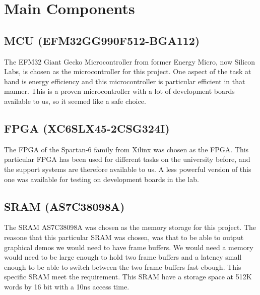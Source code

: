 \documentclass[../main/report.tex]{subfiles}
\begin{document}
\section{Main Components}

\subsection*{MCU (EFM32GG990F512-BGA112)}
The EFM32 Giant Gecko Microcontroller from former Energy Micro, now Silicon Labs, is chosen as the microcontroller for this project.
One aspect of the task at hand is energy efficiency and this microcontroller is particular efficient in that manner.
This is a proven microcontroller with a lot of development boards available to us, so it seemed like a safe choice.

\subsection*{FPGA (XC6SLX45-2CSG324I)}
The FPGA of the Spartan-6 family from Xilinx was chosen as the FPGA.
This particular FPGA has been used for different tasks on the university before, and the support systems are therefore available to us.
A less powerful version of this one was available for testing on development boards in the lab.

\subsection*{SRAM (AS7C38098A)}
The SRAM AS7C38098A was chosen as the memory storage for this project. 
The reasone that this particular SRAM was chosen, was that to be able to output graphical demos we would need to have frame buffers.
We would need a memory would need to be large enough to hold two frame buffers and a latency small enough to be able to switch between the two frame buffers fast ebough.
This specific SRAM meet the requirement.
This SRAM have a storage space at 512K words by 16 bit with a 10ns access time.
\end{document}
